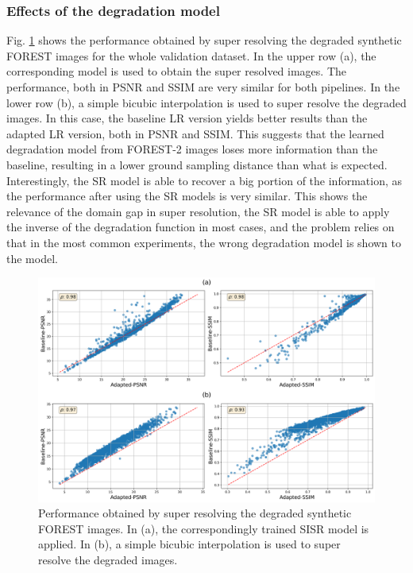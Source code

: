         \subsubsection{Effects of the degradation model}

        Fig. \ref{fig:5-source-domain-comparison} shows the performance obtained by super resolving the degraded synthetic FOREST images for the whole validation dataset.
        In the upper row (a), the corresponding model is used to obtain the super resolved images. 
        The performance, both in PSNR and SSIM are very similar for both pipelines. 
        In the lower row (b), a simple bicubic interpolation is used to super resolve the degraded images. 
        In this case, the baseline LR version yields better results than the adapted LR version, both in PSNR and SSIM.
        This suggests that the learned degradation model from FOREST-2 images loses more information than the baseline, resulting in a lower ground sampling distance than what is expected.
        Interestingly, the SR model is able to recover a big portion of the information, as the performance after using the SR models is very similar. 
        This shows the relevance of the domain gap in super resolution, the SR model is able to apply the inverse of the degradation function in most cases, and the problem relies on that in the most common experiments, the wrong degradation model is shown to the model. 

        \begin{figure}[H]
            \centering
            \includegraphics[width=\textwidth]{Includes/5-source-domain-comparison.png}
            \caption{Performance obtained by super resolving the degraded synthetic FOREST images. 
                        In (a), the correspondingly trained SISR model is applied. 
                        In (b), a simple bicubic interpolation is used to super resolve the degraded images. }
            \label{fig:5-source-domain-comparison}
        \end{figure}

